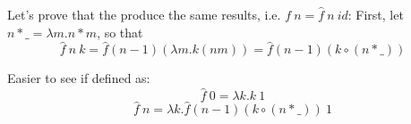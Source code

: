 \documentclass{article}
\begin{document}
Let's prove that the produce the same results, i.e. $ f\ n=\hat{f}\ n\ id$:
First, let $ n*\_ =\lambda m.n*m$, so that 
$$\hat{f}\ n\ k = \hat{f} (n - 1)(\lambda m.k(nm))=\hat{f}(n-1)(k\circ (n*\_))$$

Easier to see if defined as:
$$\hat{f}\ 0=\lambda k.k\ 1$$
$$\hat{f}\ n=\lambda k.\hat{f}(n-1)(k\circ(n*\_))\ 1$$
\end{document}
